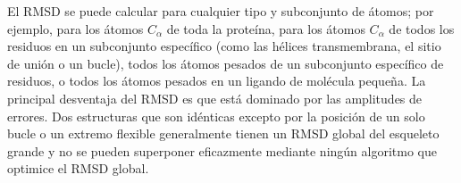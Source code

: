 \documentclass[11pt]{article}
\begin{document}
El RMSD se puede calcular para cualquier tipo y subconjunto de \'{a}tomos; por ejemplo, para los \'{a}tomos \(C_{\alpha}\) de toda la prote\'{i}na, para los \'{a}tomos \(C_{\alpha}\) de todos los residuos en un subconjunto espec\'{i}fico (como las h\'{e}lices transmembrana, el sitio de uni\'{o}n o un bucle), todos los \'{a}tomos pesados de un subconjunto espec\'{i}fico de residuos, o todos los \'{a}tomos pesados en un ligando de mol\'{e}cula pequeña. La principal desventaja del RMSD es que est\'{a} dominado por las amplitudes de errores. Dos estructuras que son id\'{e}nticas excepto por la posici\'{o}n de un solo bucle o un extremo flexible generalmente tienen un RMSD global del esqueleto grande y no se pueden superponer eficazmente mediante ning\'{u}n algoritmo que optimice el RMSD global.
\clearpage

\end{document}
